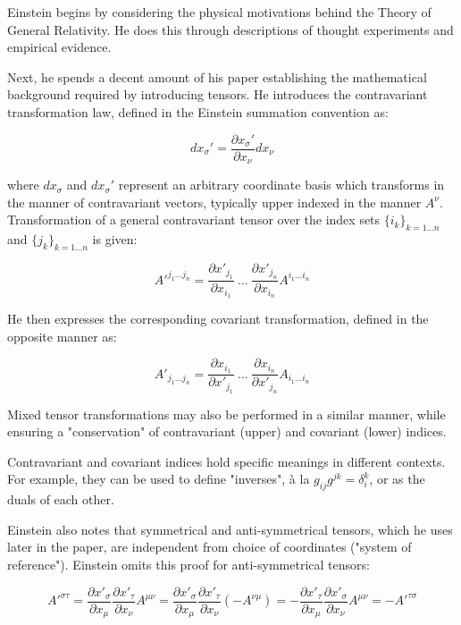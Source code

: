 \documentclass[14pt]{extarticle}
\begin{document}
Einstein begins by considering the physical motivations behind the Theory of General Relativity. He does this through descriptions of thought experiments and empirical evidence.



Next, he spends a decent amount of his paper establishing the mathematical background required by introducing tensors. He introduces the contravariant transformation law, defined in the Einstein summation convention as:

\[dx_\sigma' = \frac{\partial x_\sigma'}{\partial x_\nu} dx_\nu\]

\noindent
where $dx_\sigma$ and $dx_\sigma'$ represent an arbitrary coordinate basis which transforms in the manner of contravariant vectors, typically upper indexed in the manner $A^\nu$. Transformation of a general contravariant tensor over the index sets $\{i_k\}_{k=1 \ldots n}$ and $\{j_k\}_{k=1 \ldots n}$ is given:

\[A'^{j_1 \ldots j_n} =
\frac{\partial x'_{j_1}}{\partial x_{i_1}}
\ \ldots \ 
\frac{\partial x'_{j_n}}{\partial x_{i_n}}
A^{i_1 \ldots i_n}\]

He then expresses the corresponding covariant transformation, defined in the opposite manner as:

\[A'_{j_1 \ldots j_n} =
\frac{\partial x_{i_1}}{\partial x'_{j_1}}
\ \ldots \ 
\frac{\partial x_{i_n}}{\partial x'_{j_n}}
A_{i_1 \ldots i_n}\]

Mixed tensor transformations may also be performed in a similar manner, while ensuring a "conservation" of contravariant (upper) and covariant (lower) indices.

Contravariant and covariant indices hold specific meanings in different contexts. For example, they can be used to define "inverses", à la $g_{ij} g^{jk} = \delta_i^k$, or as the duals of each other.

Einstein also notes that symmetrical and anti-symmetrical tensors, which he uses later in the paper, are independent from choice of coordinates ("system of reference"). Einstein omits this proof for anti-symmetrical tensors:

\[
A'^{\sigma \tau }
={\frac {\partial x'_{\sigma }}{\partial x_{\mu }}}{\frac {\partial x'_{\tau }}{\partial x_{\nu }}}A^{\mu \nu }
={\frac {\partial x'_{\sigma }}{\partial x_{\mu }}}{\frac {\partial x'_{\tau }}{\partial x_{\nu }}} (-A^{\nu \mu })
=-{\frac {\partial x'_{\tau }}{\partial x_{\mu }}}{\frac {\partial x'_{\sigma }}{\partial x_{\nu }}}A^{\mu \nu }
=-A'^{\tau \sigma }
\]
\end{document}
